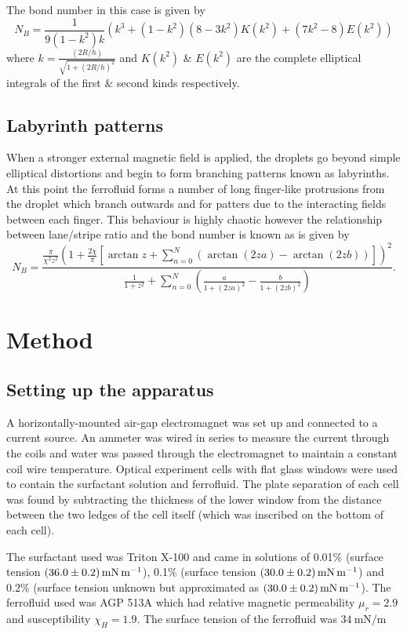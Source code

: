 \documentclass[12pt]{article}
\begin{document}
The bond number in this case is given by
\begin{equation}
N_B=\frac{1}{9(1-k^2)k}(k^3 +(1-k^2)(8-3k^2)K(k^2)+(7k^2-8)E(k^2))
\end{equation}
where $k=\frac{(2R/h)}{\sqrt{1+(2R/h)^2}}$ and $K(k^2)$ \& $E(k^2)$ are the complete elliptical integrals of the first \& second kinds respectively.\cite{ref4}

\subsection{Labyrinth patterns}
When a stronger external magnetic field is applied, the droplets go beyond simple elliptical distortions and begin to form branching patterns known as labyrinths. At this point the ferrofluid forms a number of long finger-like protrusions from the droplet which branch outwards and for patters due to the interacting fields between each finger. This behaviour is highly chaotic however the relationship between lane/stripe ratio and the bond number is known\cite{ref3} as is given by
\begin{equation}
N_B=\frac{\frac{\pi}{\chi^2 z^2}(1+\frac{2\chi}{\pi}[\arctan z + \sum_{n=0}^{N} (\arctan (2za)-\arctan (2zb))])^2}{\frac{1}{1+z^2}+\sum_{n=0}^{N} (\frac{a}{1+(2za)^2} - \frac{b}{1+(2zb)^2})}.
\end{equation}

\section{Method}
\subsection{Setting up the apparatus}
A horizontally-mounted air-gap electromagnet was set up and connected to a current source. An ammeter was wired in series to measure the current through the coils and water was passed through the electromagnet to maintain a constant coil wire temperature. Optical experiment cells with flat glass windows were used to contain the surfactant solution and ferrofluid. The plate separation of each cell was found by subtracting the thickness of the lower window from the distance between the two ledges of the cell itself (which was inscribed on the bottom of each cell).

The surfactant used was Triton X-100 and came in solutions of 0.01\% (surface tension $\SI{36.0\pm0.2}{\milli\newton\per\metre}$), 0.1\% (surface tension $\SI{30.0\pm0.2}{\milli\newton\per\metre}$) and 0.2\% (surface tension unknown but approximated as $\SI{30.0\pm0.2}{\milli\newton\per\metre}$). The ferrofluid used was AGP 513A which had relative magnetic permeability $\mu_r=2.9$ and susceptibility $\chi_H=1.9$. The surface tension of the ferrofluid was $\SI{34}{\milli\newton\per\metre}$
\end{document}
